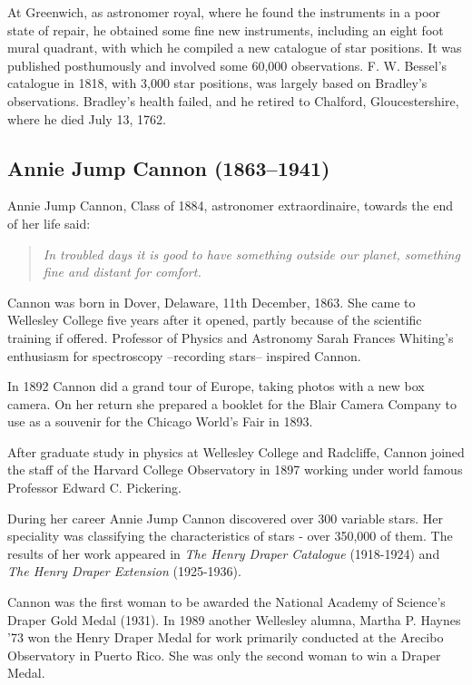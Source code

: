 At Greenwich, as astronomer royal, where he found the instruments in a poor state of repair, he obtained some fine new instruments, including an eight foot mural quadrant, with which he compiled a new catalogue of star positions. It was published posthumously and involved some 60,000 observations. F. W. Bessel's catalogue in 1818, with 3,000 star positions, was largely based on Bradley's observations. Bradley's health failed, and he retired to Chalford, Gloucestershire, where he died July 13, 1762.

\subsection[Annie \scshape{Cannon}]{Annie Jump Cannon (1863--1941)}\label{bio:cannon}
Annie Jump Cannon, Class of 1884, astronomer extraordinaire, towards the end of her life said:
\begin{quote}
\textit{In troubled days it is good to have something outside our planet, something fine and distant for comfort.}
\end{quote}

Cannon was born in Dover, Delaware, 11th December, 1863. She came to Wellesley College five years after it opened, partly because of the scientific training if offered. Professor of Physics and Astronomy Sarah Frances Whiting's enthusiasm for spectroscopy --recording stars-- inspired Cannon.

In 1892 Cannon did a grand tour of Europe, taking photos with a new box camera. On her return she prepared a booklet for the Blair Camera Company to use as a souvenir for the Chicago World's Fair in 1893.

After graduate study in physics at Wellesley College and Radcliffe, Cannon joined the staff of the Harvard College Observatory in 1897 working under world famous Professor Edward C. Pickering.

During her career Annie Jump Cannon discovered over 300 variable stars. Her speciality was classifying the characteristics of stars - over 350,000 of them. The results of her work appeared in \textit{The Henry Draper Catalogue} (1918-1924) and \textit{The Henry Draper Extension} (1925-1936).

Cannon was the first woman to be awarded the National Academy of Science's Draper Gold Medal (1931). In 1989 another Wellesley alumna, Martha P. Haynes '73 won the Henry Draper Medal for work primarily conducted at the Arecibo Observatory in Puerto Rico. She was only the second woman to win a Draper Medal.

